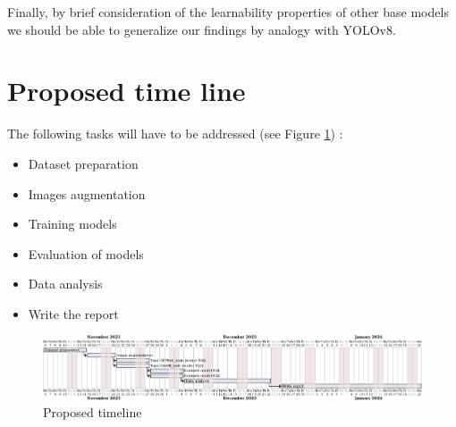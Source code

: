\documentclass[]{article}
\begin{document}
	Finally, by brief consideration of the learnability properties of other base models we should be able to generalize our findings by analogy with YOLO{\small v8}.
	

\section{Proposed time line}

The following tasks will have to be addressed (see Figure \ref{fig:timeline}) :
\begin{itemize}
	\item Dataset preparation
	\item Images augmentation
	\item Training models
	\item Evaluation of models
	\item Data analysis
	\item Write the report
\end{itemize}

\begin{figure}[H]
	\centering
	\includegraphics[width=\textwidth]{proposal-timing}
	\caption{Proposed timeline}
	\label{fig:timeline}
\end{figure}

\printbibliography
\end{document}
